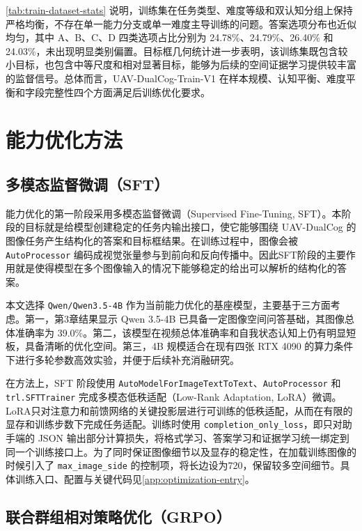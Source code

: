 \autoref{tab:train-dataset-stats} 说明，训练集在任务类型、难度等级和双认知分组上保持严格均衡，不存在单一能力分支或单一难度主导训练的问题。答案选项分布也近似均匀，其中 A、B、C、D 四类选项占比分别为 24.78\%、24.79\%、26.40\% 和 24.03\%，未出现明显类别偏置。目标框几何统计进一步表明，该训练集既包含较小目标，也包含中等尺度和相对显著目标，能够为后续的空间证据学习提供较丰富的监督信号。总体而言，UAV-DualCog-Train-V1 在样本规模、认知平衡、难度平衡和字段完整性四个方面满足后训练优化要求。

\section{能力优化方法}

\subsection{多模态监督微调（SFT）}

能力优化的第一阶段采用多模态监督微调（Supervised Fine-Tuning, SFT）。本阶段的目标就是给模型创建稳定的任务内输出接口，使它能够围绕 UAV-DualCog 的图像任务产生结构化的答案和目标框结果。在训练过程中，图像会被 \texttt{AutoProcessor} 编码成视觉张量参与到前向和反向传播中。因此SFT阶段的主要作用就是使得模型在多个图像输入的情况下能够稳定的给出可以解析的结构化的答案。

本文选择 \texttt{Qwen/Qwen3.5-4B} 作为当前能力优化的基座模型，主要基于三方面考虑。第一，第3章结果显示 Qwen 3.5-4B 已具备一定图像空间问答基础，其图像总体准确率为 39.0\%。第二，该模型在视频总体准确率和自我状态认知上仍有明显短板，具备清晰的优化空间。第三，4B 规模适合在现有四张 RTX 4090 的算力条件下进行多轮参数高效实验，并便于后续补充消融研究。

在方法上，SFT 阶段使用 \texttt{AutoModelForImageTextToText}、\texttt{AutoProcessor} 和 \texttt{trl.SFTTrainer} 完成多模态低秩适配（Low-Rank Adaptation, LoRA）微调。LoRA只对注意力和前馈网络的关键投影层进行可训练的低秩适配，从而在有限的显存和训练步数下完成任务适配。训练时使用  \texttt{completion\_only\_loss}，即只对助手端的 JSON 输出部分计算损失，将格式学习、答案学习和证据学习统一绑定到同一个训练接口上。为了同时保证图像细节以及显存的稳定性，在加载训练图像的时候引入了 \texttt{max\_image\_side} 的控制项，将长边设为720，保留较多空间细节。具体训练入口、配置与关键代码见\autoref{app:optimization-entry}。


\subsection{联合群组相对策略优化（GRPO）}

